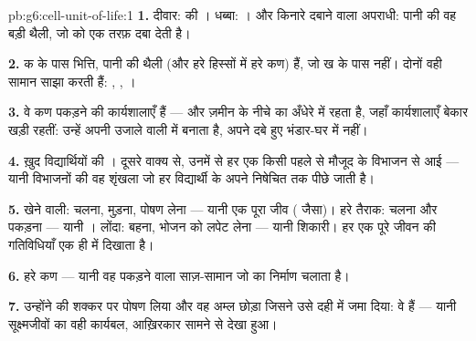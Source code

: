 \begin{solution}{pb:g6:cell-unit-of-life:1}
\textbf{1.} दीवार:  की । धब्बा: । और किनारे
दबाने वाला अपराधी: पानी की वह बड़ी थैली, जो  को एक तरफ़ दबा देती
है।

\textbf{2.} क के पास भित्ति, पानी की थैली (और हरे हिस्सों में हरे कण)
हैं, जो ख के पास नहीं। दोनों वही सामान साझा करती हैं: ,
, ।

\textbf{3.} वे कण  पकड़ने की कार्यशालाएँ हैं --- और ज़मीन के नीचे
का  अँधेरे में रहता है, जहाँ कार्यशालाएँ बेकार खड़ी रहतीं: 
उन्हें अपनी उजाले वाली  में बनाता है, अपने दबे हुए भंडार-घर में
नहीं।

\textbf{4.} ख़ुद विद्यार्थियों की । दूसरे वाक्य से, उनमें से हर
एक किसी पहले से मौजूद  के विभाजन से आई --- यानी विभाजनों की वह
शृंखला जो हर विद्यार्थी के अपने निषेचित  तक पीछे जाती है।

\textbf{5.} खेने वाली: चलना, मुड़ना, पोषण लेना --- यानी एक पूरा
 जीव ( जैसा)। हरे तैराक: चलना और  पकड़ना --- यानी
 । लोंदा: बहना, भोजन को लपेट लेना --- यानी 
शिकारी। हर एक पूरे जीवन की गतिविधियाँ एक ही  में दिखाता है।

\textbf{6.} हरे कण --- यानी वह  पकड़ने वाला साज़-सामान जो
 का निर्माण चलाता है।

\textbf{7.} उन्होंने  की शक्कर पर पोषण लिया और वह अम्ल छोड़ा जिसने
उसे दही में जमा दिया: वे   हैं --- यानी सूक्ष्मजीवों का
वही कार्यबल, आख़िरकार सामने से देखा हुआ।


\end{solution}
